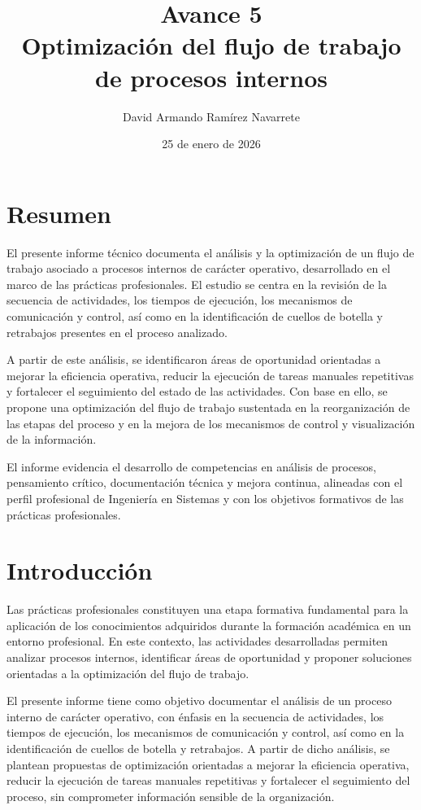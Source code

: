 \documentclass[12pt]{article}
\title{Avance 5 \\ Optimización del flujo de trabajo de procesos internos}
\author{David Armando Ramírez Navarrete}
\date{25 de enero de 2026}
\begin{document}
\maketitle

\section*{Resumen}
El presente informe técnico documenta el análisis y la optimización de un flujo de trabajo asociado a procesos internos de carácter operativo, desarrollado en el marco de las prácticas profesionales. El estudio se centra en la revisión de la secuencia de actividades, los tiempos de ejecución, los mecanismos de comunicación y control, así como en la identificación de cuellos de botella y retrabajos presentes en el proceso analizado.

A partir de este análisis, se identificaron áreas de oportunidad orientadas a mejorar la eficiencia operativa, reducir la ejecución de tareas manuales repetitivas y fortalecer el seguimiento del estado de las actividades. Con base en ello, se propone una optimización del flujo de trabajo sustentada en la reorganización de las etapas del proceso y en la mejora de los mecanismos de control y visualización de la información.

El informe evidencia el desarrollo de competencias en análisis de procesos, pensamiento crítico, documentación técnica y mejora continua, alineadas con el perfil profesional de Ingeniería en Sistemas y con los objetivos formativos de las prácticas profesionales.


\section*{Introducción}
Las prácticas profesionales constituyen una etapa formativa fundamental para la aplicación de los conocimientos adquiridos durante la formación académica en un entorno profesional. En este contexto, las actividades desarrolladas permiten analizar procesos internos, identificar áreas de oportunidad y proponer soluciones orientadas a la optimización del flujo de trabajo.

El presente informe tiene como objetivo documentar el análisis de un proceso interno de carácter operativo, con énfasis en la secuencia de actividades, los tiempos de ejecución, los mecanismos de comunicación y control, así como en la identificación de cuellos de botella y retrabajos. A partir de dicho análisis, se plantean propuestas de optimización orientadas a mejorar la eficiencia operativa, reducir la ejecución de tareas manuales repetitivas y fortalecer el seguimiento del proceso, sin comprometer información sensible de la organización.
\end{document}
